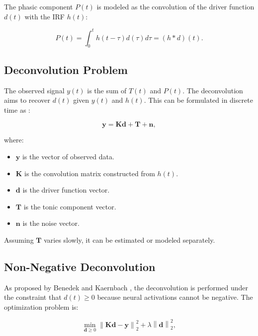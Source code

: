 \documentclass[twocolumn]{article}
\begin{document}
The phasic component \( P(t) \) is modeled as the convolution of the driver function \( d(t) \) with the IRF \( h(t) \):

\begin{equation}
P(t) = \int_{0}^{t} h(t - \tau) d(\tau) d\tau = (h * d)(t).
\end{equation}

\subsection*{Deconvolution Problem}

The observed signal \( y(t) \) is the sum of \( T(t) \) and \( P(t) \). The deconvolution aims to recover \( d(t) \) given \( y(t) \) and \( h(t) \). This can be formulated in discrete time as \cite{nihDecompositionSkin}:

\begin{equation}
\mathbf{y} = \mathbf{K} \mathbf{d} + \mathbf{T} + \mathbf{n},
\end{equation}

where:

\begin{itemize}
    \item \( \mathbf{y} \) is the vector of observed data.
    \item \( \mathbf{K} \) is the convolution matrix constructed from \( h(t) \).
    \item \( \mathbf{d} \) is the driver function vector.
    \item \( \mathbf{T} \) is the tonic component vector.
    \item \( \mathbf{n} \) is the noise vector.
\end{itemize}

Assuming \( \mathbf{T} \) varies slowly, it can be estimated or modeled separately.

\subsection*{Non-Negative Deconvolution}

As proposed by Benedek and Kaernbach \cite{nihDecompositionSkin}, the deconvolution is performed under the constraint that \( d(t) \geq 0 \) because neural activations cannot be negative. The optimization problem is:

\begin{equation}
\min_{\mathbf{d} \geq 0} \left\| \mathbf{K} \mathbf{d} - \mathbf{y} \right\|_2^2 + \lambda \left\| \mathbf{d} \right\|_2^2,
\end{equation}
\end{document}
